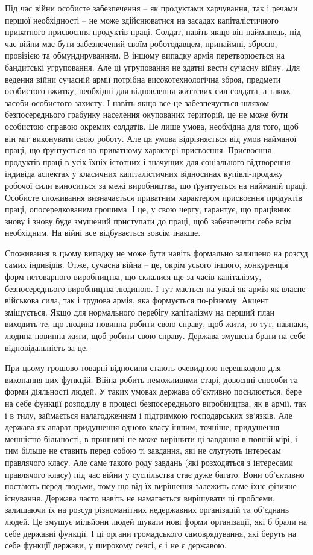 \documentclass[../main]{subfiles}
\begin{document}
Під час війни особисте забезпечення – як продуктами харчування, так і речами першої необхідності – не може здійснюватися на засадах капіталістичного приватного присвоєння продуктів праці. Солдат, навіть якщо він найманець, під час війни має бути забезпечений своїм роботодавцем, принаймні, зброєю, провізією та обмундируванням. В іншому випадку армія перетворюється на бандитські угруповання. Але ці угруповання не здатні вести сучасну війну. Для ведення війни сучасній армії потрібна високотехнологічна зброя, предмети особистого вжитку, необхідні для відновлення життєвих сил солдата, а також засоби особистого захисту. І навіть якщо все це забезпечується шляхом безпосереднього грабунку населення окупованих територій, це не може бути особистою справою окремих солдатів. Це лише умова, необхідна для того, щоб він міг виконувати свою роботу. Але ця умова відрізняється від умов найманої праці, що ґрунтується на приватному характері присвоєння. Присвоєння продуктів праці в усіх їхніх істотних і значущих для соціального відтворення індивіда аспектах у класичних капіталістичних відносинах купівлі-продажу робочої сили виноситься за межі виробництва, що ґрунтується на найманій праці. Особисте споживання визначається приватним характером присвоєння продуктів праці, опосередкованим грошима. І це, у свою чергу, гарантує, що працівник знову і знову буде змушений приступати до праці, щоб забезпечити себе всім необхідним. На війні все відбувається зовсім інакше.

Споживання в цьому випадку не може бути навіть формально залишено на розсуд самих індивідів. Отже, сучасна війна – це, окрім усього іншого, конкуренція форм нетоварного виробництва, що склалися ще за часів капіталізму, – безпосереднього виробництва людиною. І тут мається на увазі як армія як власне військова сила, так і трудова армія, яка формується по-різному. Акцент зміщується. Якщо для нормального перебігу капіталізму на перший план виходить те, що людина повинна робити свою справу, щоб жити, то тут, навпаки, людина повинна жити, щоб робити свою справу. Держава змушена брати на себе відповідальність за це.

При цьому грошово-товарні відносини стають очевидною перешкодою для виконання цих функцій. Війна робить неможливими старі, довоєнні способи та форми діяльності людей. У таких умовах держава об’єктивно посилюється, бере на себе функції розподілу в процесі безпосереднього виробництва, як в армії, так і в тилу, займається налагодженням і підтримкою господарських зв’язків. Але держава як апарат придушення одного класу іншим, точніше, придушення меншістю більшості, в принципі не може вирішити ці завдання в повній мірі, і тим більше не ставить перед собою ті завдання, які не слугують інтересам правлячого класу. Але саме такого роду завдань (які розходяться з інтересами правлячого класу) під час війни у суспільства стає дуже багато. Вони об’єктивно постають перед людьми, тому що від їх вирішення залежить саме їхнє фізичне існування. Держава часто навіть не намагається вирішувати ці проблеми, залишаючи їх на розсуд різноманітних недержавних організацій та об’єднань людей. Це змушує мільйони людей шукати нові форми організації, які б брали на себе державні функції. І ці органи громадського самоврядування, які беруть на себе функції держави, у широкому сенсі, є і не є державою.
\end{document}
